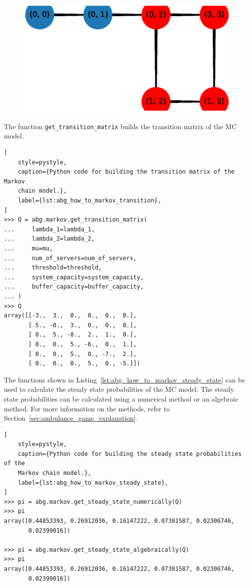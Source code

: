 \begin{figure}[H]
    \centering
    \includegraphics[width=\textwidth]{chapters/00_appendix/01_ambulance_game_library/Bin/visualise_markov.eps}
\end{figure}

The function \texttt{get\_transition\_matrix} builds the transition matrix
of the MC model.

\begin{lstlisting}[
    style=pystyle,
    caption={Python code for building the transition matrix of the Markov
    chain model.},
    label={lst:abg_how_to_markov_transition},
]
>>> Q = abg.markov.get_transition_matrix(
...     lambda_1=lambda_1,
...     lambda_2=lambda_2,
...     mu=mu,
...     num_of_servers=num_of_servers,
...     threshold=threshold,
...     system_capacity=system_capacity,
...     buffer_capacity=buffer_capacity,
... )
>>> Q
array([[-3.,  3.,  0.,  0.,  0.,  0.],
       [ 5., -8.,  3.,  0.,  0.,  0.],
       [ 0.,  5., -8.,  2.,  1.,  0.],
       [ 0.,  0.,  5., -6.,  0.,  1.],
       [ 0.,  0.,  5.,  0., -7.,  2.],
       [ 0.,  0.,  0.,  5.,  0., -5.]])

\end{lstlisting}

The functions shown in Listing~\ref{lst:abg_how_to_markov_steady_state} can be
used to calculate the steady state probabilities of the MC model.
The steady state probabilities can be calculated using a numerical method or
an algebraic method.
For more information on the methods, refer to
Section~\ref{sec:ambulance_game_explanation}.

\begin{lstlisting}[
    style=pystyle,
    caption={Python code for building the steady state probabilities of the
    Markov chain model.},
    label={lst:abg_how_to_markov_steady_state},
]
>>> pi = abg.markov.get_steady_state_numerically(Q)
>>> pi
array([0.44853393, 0.26912036, 0.16147222, 0.07381587, 0.02306746,
       0.02399016])

>>> pi = abg.markov.get_steady_state_algebraically(Q)
>>> pi
array([0.44853393, 0.26912036, 0.16147222, 0.07381587, 0.02306746,
       0.02399016])
    
\end{lstlisting}

